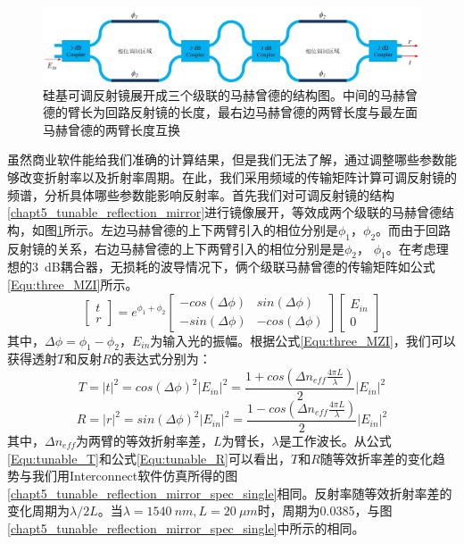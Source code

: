 \begin{figure}[htb]
	\centering
	\includegraphics[width=15cm]{./Pictures/chapt5_tunable_reflection_mirror_flatten.jpg}
	\caption{硅基可调反射镜展开成三个级联的马赫曾德的结构图。中间的马赫曾德的臂长为回路反射镜的长度，最右边马赫曾德的两臂长度与最左面马赫曾德的两臂长度互换}
	\label{chapt5_tunable_reflection_mirror_flatten}
\end{figure}
虽然商业软件能给我们准确的计算结果，但是我们无法了解，通过调整哪些参数能够改变折射率以及折射率周期。在此，我们采用频域的传输矩阵计算可调反射镜的频谱，分析具体哪些参数能影响反射率。首先我们对可调反射镜的结构\ref{chapt5_tunable_reflection_mirror}进行镜像展开，等效成两个级联的马赫曾德结构，如图\ref{chapt5_tunable_reflection_mirror_flatten}所示。左边马赫曾德的上下两臂引入的相位分别是$\phi_1$，$\phi_2$。而由于回路反射镜的关系，右边马赫曾德的上下两臂引入的相位分别是是$\phi_2$， $\phi_1$。在考虑理想的3~dB耦合器，无损耗的波导情况下，俩个级联马赫曾德的传输矩阵如公式\ref{Equ:three_MZI}所示。
\begin{equation}
\label{Equ:three_MZI}
\begin{bmatrix}
t\\
r
\end{bmatrix}
= e^{\phi_1+\phi_2}
\begin{bmatrix}
-cos(\Delta \phi) & sin(\Delta \phi)\\
-sin(\Delta \phi) & -cos(\Delta \phi)
\end{bmatrix}
\begin{bmatrix}
E_{in}\\
0
\end{bmatrix}
\end{equation}
其中，$\Delta \phi = \phi_1-\phi_2$，$E_{in}$为输入光的振幅。根据公式\ref{Equ:three_MZI}，我们可以获得透射$T$和反射$R$的表达式分别为：
\begin{equation}
\label{Equ:tunable_T}
T = |t|^2 = cos(\Delta \phi)^2 |E_{in}|^2 = \frac{1+cos(\Delta n_{eff}\frac{4\pi L}{\lambda})}{2}|E_{in}|^2
\end{equation}
\begin{equation}
\label{Equ:tunable_R}
R = |r|^2 = sin(\Delta \phi)^2 |E_{in}|^2= \frac{1-cos(\Delta n_{eff}\frac{4\pi L}{\lambda})}{2}|E_{in}|^2
\end{equation}
其中，$\Delta n_{eff}$为两臂的等效折射率差，$L$为臂长，$\lambda$是工作波长。从公式\ref{Equ:tunable_T}和公式\ref{Equ:tunable_R}可以看出，$T$和$R$随等效折率差的变化趋势与我们用Interconnect软件仿真所得的图\ref{chapt5_tunable_reflection_mirror_spec_single}相同。反射率随等效折射率差的变化周期为$\lambda/2L$。当$\lambda = 1540~nm, L = 20~\mu m$时，周期为0.0385，与图\ref{chapt5_tunable_reflection_mirror_spec_single}中所示的相同。

